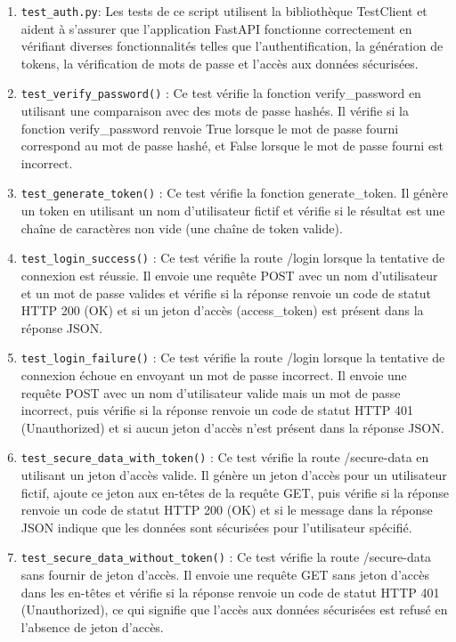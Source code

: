 \documentclass[12pt]{article}
\begin{document}
\begin{enumerate}
	\item \texttt{test\_auth.py}: Les tests de ce script utilisent la bibliothèque TestClient et aident à s'assurer que l'application FastAPI fonctionne correctement en vérifiant diverses fonctionnalités telles que l'authentification, la génération de tokens, la vérification de mots de passe et l'accès aux données sécurisées.
	
	\item \texttt{test\_verify\_password()} : Ce test vérifie la fonction verify\_password en utilisant une comparaison avec des mots de passe hashés. Il vérifie si la fonction verify\_password renvoie True lorsque le mot de passe fourni correspond au mot de passe hashé, et False lorsque le mot de passe fourni est incorrect.
	
	\item \texttt{test\_generate\_token()} : Ce test vérifie la fonction generate\_token. Il génère un token en utilisant un nom d'utilisateur fictif et vérifie si le résultat est une chaîne de caractères non vide (une chaîne de token valide).
	
	\item \texttt{test\_login\_success()} : Ce test vérifie la route /login lorsque la tentative de connexion est réussie. Il envoie une requête POST avec un nom d'utilisateur et un mot de passe valides et vérifie si la réponse renvoie un code de statut HTTP 200 (OK) et si un jeton d'accès (access\_token) est présent dans la réponse JSON.
	
	\item \texttt{test\_login\_failure()} : Ce test vérifie la route /login lorsque la tentative de connexion échoue en envoyant un mot de passe incorrect. Il envoie une requête POST avec un nom d'utilisateur valide mais un mot de passe incorrect, puis vérifie si la réponse renvoie un code de statut HTTP 401 (Unauthorized) et si aucun jeton d'accès n'est présent dans la réponse JSON.
	
	\item \texttt{test\_secure\_data\_with\_token()} : Ce test vérifie la route /secure-data en utilisant un jeton d'accès valide. Il génère un jeton d'accès pour un utilisateur fictif, ajoute ce jeton aux en-têtes de la requête GET, puis vérifie si la réponse renvoie un code de statut HTTP 200 (OK) et si le message dans la réponse JSON indique que les données sont sécurisées pour l'utilisateur spécifié.
	
	\item \texttt{test\_secure\_data\_without\_token()} : Ce test vérifie la route /secure-data sans fournir de jeton d'accès. Il envoie une requête GET sans jeton d'accès dans les en-têtes et vérifie si la réponse renvoie un code de statut HTTP 401 (Unauthorized), ce qui signifie que l'accès aux données sécurisées est refusé en l'absence de jeton d'accès.
	

\end{enumerate}
\end{document}

